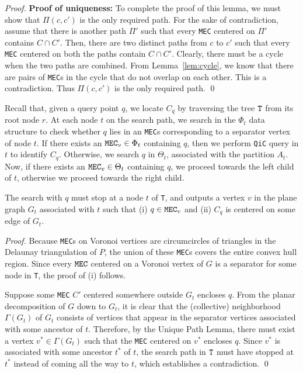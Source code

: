 \documentclass[12pt]{llncs}
\begin{document}
\begin{proof}
{\bf Proof of uniqueness:} To complete the proof of this lemma, we 
must show that $\Pi(c,c')$ is the only required path. For the sake 
of contradiction, assume that there is another path $\Pi'$ such that 
every {\tt MEC} centered on $\Pi'$ contains $C \cap C'$. Then, there are 
two distinct paths from $c$ to $c'$ such that every {\tt MEC} centered 
on both the paths contain $C \cap C'$. Clearly, there must be a cycle 
when the two paths are combined. From Lemma~\ref{lem:cycle}, we know 
that there are pairs of {\tt MEC}s in the cycle that do not overlap on 
each other. This is a contradiction. Thus $\Pi(c,c')$ is the only 
required path.  
\qed
\end{proof}


Recall that,
given a query point $q$, we locate $C_q$ by traversing the tree ${\tt T}$ from its root 
node $r$. At each node $t$ on the search path, we search in the $\Phi_t$ data 
structure 
to check whether $q$ lies in an {\tt MEC}s corresponding to a separator vertex of 
node $t$.
If there exists an ${\tt MEC}_v \in \Phi_t$ containing $q$, then we perform {\tt QiC} 
query in $t$ to identify $C_q$.   
Otherwise,  we search $q$ in $\Theta_t$, 
associated with the partition $A_t$. Now, if there exists an ${\tt MEC}_v \in 
\Theta_t$ containing $q$, we proceed towards the left child of $t$, otherwise we proceed 
towards the right child.
\begin{lemma}\label{lz}
The search with $q$ must stop at a node $t$ of {\tt T}, and outputs a vertex $v$ in the plane graph $G_t$ associated with $t$ such that (i) $q \in {\tt MEC}_v$ and (ii) $C_q$ is centered on some edge of $G_t$.
\end{lemma}
\begin{proof}
Because {\tt MEC}s on Voronoi vertices are circumcircles of triangles in the Delaunay triangulation of $P$,  the union of these {\tt MEC}s covers the entire convex hull region. Since every ${\tt MEC}$ centered on a Voronoi vertex of $G$ is a separator for some node in {\tt T}, the proof of (i) follows. 

Suppose some {\tt MEC} $C'$ centered somewhere outside $G_t$ encloses $q$.
From the planar decomposition of $G$ down to $G_t$, it is clear that the (collective) neighborhood $\Gamma(G_t)$ of $G_t$ consists of vertices that appear in the separator vertices associated with some ancestor of $t$. Therefore, by the Unique Path Lemma, there must exist a vertex $v^* \in \Gamma(G_t)$ such that the {\tt MEC} centered on $v^*$ encloses $q$. Since $v^*$ is associated with some ancestor $t^*$ of $t$, the search path in ${\tt T}$ must have stopped at $t^*$  instead of coming all the way to $t$, which establishes a contradiction.
\qed
\end{proof}
\end{document}
